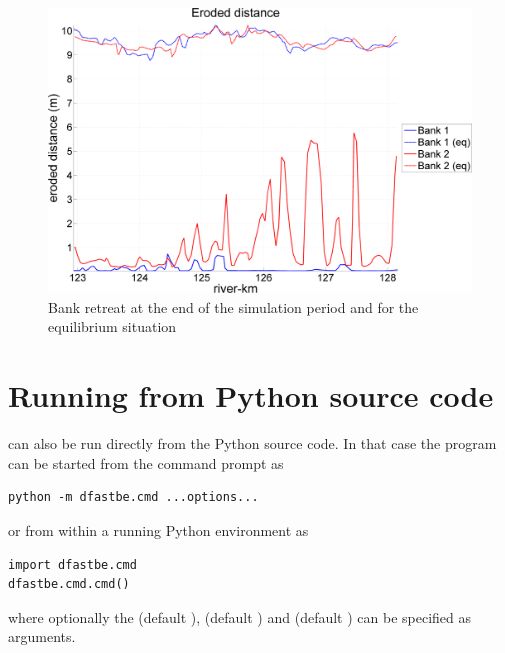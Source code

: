 \begin{figure}
\includegraphics[width=\textwidth]{figures/Fig2-13.png}
\caption{Bank retreat at the end of the simulation period and for the equilibrium situation}
\label{Fig2.13}
\end{figure}

\section{Running from Python source code}
\dfastbe can also be run directly from the Python source code.
In that case the program can be started from the command prompt as

\begin{Verbatim}
python -m dfastbe.cmd ...options...
\end{Verbatim}

or from within a running Python environment as

\begin{Verbatim}
import dfastbe.cmd
dfastbe.cmd.cmd()
\end{Verbatim}

where optionally the  (default ),  (default ) and  (default ) can be specified as arguments.